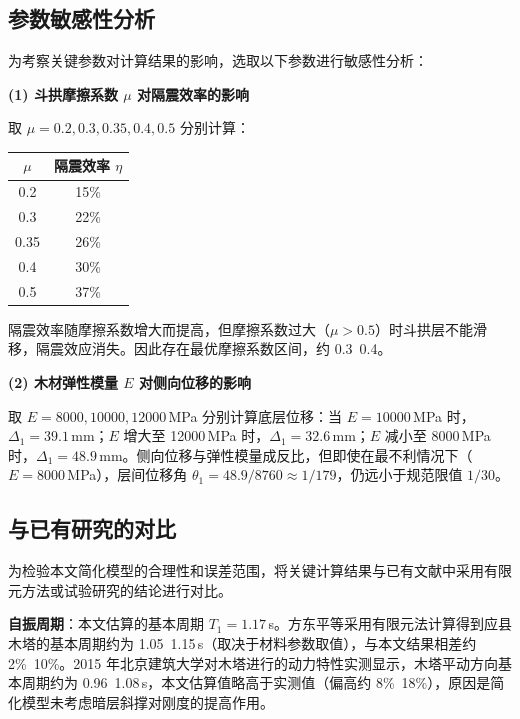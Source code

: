 \documentclass[12pt,a4paper,UTF8]{ctexart}
\begin{document}
\subsection{参数敏感性分析}
\label{sec:sensitivity}

为考察关键参数对计算结果的影响，选取以下参数进行敏感性分析：

\textbf{(1) 斗拱摩擦系数 $\mu$ 对隔震效率的影响}

取 $\mu = 0.2, 0.3, 0.35, 0.4, 0.5$ 分别计算：
\begin{center}
    \begin{tabular}{cc}
        \toprule
        $\mu$ & 隔震效率 $\eta$ \\
        \midrule
        0.2   & 15\%        \\
        0.3   & 22\%        \\
        0.35  & 26\%        \\
        0.4   & 30\%        \\
        0.5   & 37\%        \\
        \bottomrule
    \end{tabular}
\end{center}

隔震效率随摩擦系数增大而提高，但摩擦系数过大（$\mu > 0.5$）时斗拱层不能滑移，隔震效应消失。因此存在最优摩擦系数区间，约 0.3~0.4。

\textbf{(2) 木材弹性模量 $E$ 对侧向位移的影响}

取 $E = 8000, 10000, 12000$\,MPa 分别计算底层位移：当 $E = 10000$\,MPa 时，$\Delta_1 = 39.1$\,mm；$E$ 增大至 12000\,MPa 时，$\Delta_1 = 32.6$\,mm；$E$ 减小至 8000\,MPa 时，$\Delta_1 = 48.9$\,mm。侧向位移与弹性模量成反比，但即使在最不利情况下（$E=8000$\,MPa），层间位移角 $\theta_1 = 48.9/8760 \approx 1/179$，仍远小于规范限值 $1/30$。

\subsection{与已有研究的对比}
\label{sec:comparison}

为检验本文简化模型的合理性和误差范围，将关键计算结果与已有文献中采用有限元方法或试验研究的结论进行对比。

\textbf{自振周期}：本文估算的基本周期 $T_1 = 1.17$\,s。方东平等\cite{fang2001}采用有限元法计算得到应县木塔的基本周期约为 1.05~1.15\,s（取决于材料参数取值），与本文结果相差约 2\%~10\%。2015 年北京建筑大学对木塔进行的动力特性实测显示，木塔平动方向基本周期约为 0.96~1.08\,s，本文估算值略高于实测值（偏高约 8\%~18\%），原因是简化模型未考虑暗层斜撑对刚度的提高作用。
\end{document}

